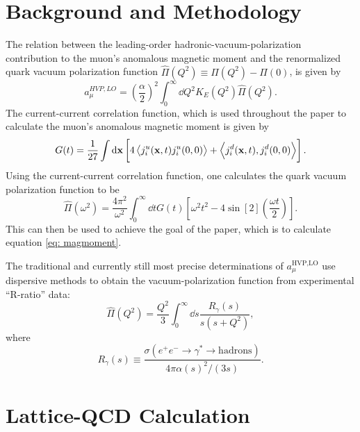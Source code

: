 \documentclass[
a4paper,
10pt,
twoside,
prd,
aps,
nofootinbib,
superscriptaddress,
floatfix,
preprintnumbers,
]{article}
\begin{document}
\section{Background and Methodology}
The relation between the leading-order hadronic-vacuum-polarization contribution to the muon’s anomalous magnetic moment and the renormalized quark vacuum polarization function $\hat{\Pi}(Q^2) \equiv \Pi(Q^2) - \Pi(0)$, is given by\cite{Davies_2020}
\begin{equation}
	a_\mu^{HVP,LO} = \left(\frac{\alpha}{2}\right)^2 \int_0^\infty \dd{Q^2} K_E (Q^2) \hat{\Pi}(Q^2).
	\label{eq: magmoment}
\end{equation}
The current-current correlation function, which is used throughout the paper to calculate the muon's anomalous magnetic moment is given by\cite{Davies_2020}
\begin{equation}
	G(t) = \frac{1}{27} \int \dd{\vb{x}} \left[4\ev{j_i^u(\vb{x},t)j_i^u(0,0)} + \ev{j_i^d(\vb{x},t),j_i^d(0,0)}\right].
\end{equation}
Using the current-current correlation function, one calculates the quark vacuum polarization function to be\cite{Davies_2020}
\begin{equation}
	\hat{\Pi}(\omega^2) = \frac{4\pi^2}{\omega^2} \int_0^\infty \dd{t} G(t) \left[\omega^2t^2-4\sin[2](\frac{\omega t}{2})\right].
\end{equation}
This can then be used to achieve the goal of the paper, which is to calculate equation \ref{eq: magmoment}.

The traditional and currently still most precise determinations of $a_\mu^{\text{HVP,LO}}$ use dispersive methods to obtain the vacuum-polarization function from experimental “R-ratio” data\cite{Davies_2020}:
\begin{equation}
	\hat{\Pi}(Q^2) = \frac{Q^2}{3} \int_0^\infty \dd{s}\frac{R_\gamma(s)}{s(s+Q^2)},
\end{equation}
where
\begin{equation}
	R_\gamma (s) \equiv \frac{\sigma(e^+e^- \rightarrow \gamma^* \rightarrow \text{hadrons})}{4\pi\alpha(s)^2/(3s)}.
\end{equation}

\section{Lattice-QCD Calculation}
\label{sec: LatCalc}
\end{document}
